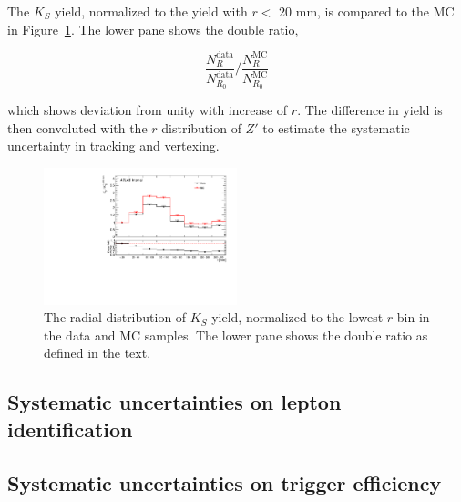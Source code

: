 The $K_{S}$ yield, normalized to the yield with $r <$ 20 mm, is compared to the MC in Figure~\ref{fig:Ks_double_ratio}. The lower pane shows the double ratio,

\begin{equation}
\frac{N^{\mathrm{data}}_{R}}{N^{\mathrm{data}}_{R_{0}}} \bigg/ \frac{N^{\mathrm{MC}}_{R}}{N^{\mathrm{MC}}_{R_{0}}}
\label{eq:ks_double_ratio}
\end{equation}

which shows deviation from unity with increase of $r$. The difference in yield is then convoluted with the $r$ distribution of $Z'$ to estimate the systematic uncertainty in tracking and vertexing.

\begin{figure}[!htb]
	\includegraphics[width=0.50\textwidth]{figures/m_syst_Ks_ratio.pdf}
	\centering
	\caption{The radial distribution of $K_{S}$ yield, normalized to the lowest $r$ bin in the data and MC samples. The lower pane shows the double ratio as defined in the text.}
	\label{fig:Ks_double_ratio}
\end{figure}



\subsection{Systematic uncertainties on lepton identification}
\label{sec:syst_leptonID}

\subsection{Systematic uncertainties on trigger efficiency}
\label{sec:syst_trigger}
